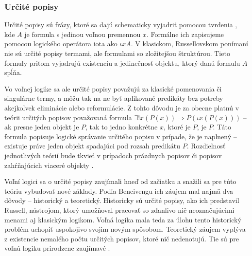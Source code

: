 \documentclass[12pt, letterpaper]{article}
\begin{document}
\subsubsection{Určité popisy}
Určité popisy sú frázy, ktoré sa dajú schematicky vyjadriť pomocou tvrdenia , kde $A$ je formula s jedinou voľnou premennou $x$. Formálne ich zapisujeme pomocou logického operátora iota ako $\iota x A$. V klasickom, Russellovskom ponímaní nie sú určité popisy termami, ale formulami so zložitejšou štruktúrou. Tieto formuly pritom vyjadrujú existenciu a jedinečnosť objektu, ktorý danú formulu $A$ spĺňa.\par 
Vo voľnej logike sa ale určité popisy považujú za klasické pomenovania či singulárne termy, a môžu tak na ne byť aplikované predikáty bez potreby akejkoľvek eliminácie alebo reformulácie. Z tohto dôvodu je za obecne platnú v teórii určitých popisov považovaná formula $\exists ! x (P(x)) \Rightarrow P(\iota x (P(x)))$ -- ak presne jeden objekt je $P$, tak to jedno konkrétne $x$, ktoré je $P$, je $P$. Táto formula popisuje logické správanie určitého popisu v prípade, že je naplnený -- existuje práve jeden objekt spadajúci pod rozsah predikátu $P$. Rozdielnosť jednotlivých teórií bude tkvieť v prípadoch prázdnych popisov či popisov zahŕňajúcich viaceré objekty \parencites[188]{Bencivenga2002}[69--71]{LambertHierarchy}[271--272]{Lambert2017}[19]{Morscher2001}[1040]{Nolt2007}[]{sep-logic-free}.\par

Voľní logici sa o určité popisy zaujímali hneď od začiatku a snažili sa pre túto teóriu vybudovať nové základy. Podľa Bencivengu ich záujem mal najmä dva dôvody -- historický a teoretický. Historicky sú určité popisy, ako ich predstavil Russell, nástrojom, ktorý umožňoval pracovať so zdanlivo nič neoznačujúcimi menami aj klasickým logikom. Voľná logika mala teda za úlohu tento historický problém uchopiť uspokojivo svojim novým spôsobom. Teoretický záujem vyplýva z existencie nemalého počtu určitých popisov, ktoré nič nedenotujú. Tie sú pre voľnú logiku prirodzene zaujímavé \parencites[188]{Bencivenga2002}.\par

\end{document}
